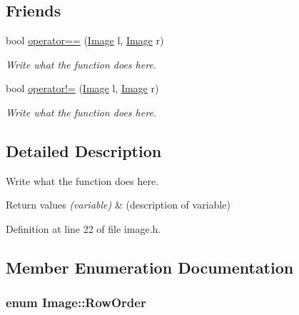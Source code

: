 \subsection*{Friends}
\begin{DoxyCompactItemize}
\item 
bool \hyperlink{classImage_a2304aa1c9fbc445512db17eadc2c3f6f}{operator==} (\hyperlink{classImage}{Image} l, \hyperlink{classImage}{Image} r)
\begin{DoxyCompactList}\small\item\em Write what the function does here. \end{DoxyCompactList}\item 
bool \hyperlink{classImage_ac96614d2b0093664f753bb88a95c0815}{operator!=} (\hyperlink{classImage}{Image} l, \hyperlink{classImage}{Image} r)
\begin{DoxyCompactList}\small\item\em Write what the function does here. \end{DoxyCompactList}\end{DoxyCompactItemize}


\subsection{Detailed Description}
Write what the function does here. 


\begin{DoxyRetVals}{Return values}
{\em (variable)} & (description of variable) \\
\hline
\end{DoxyRetVals}


Definition at line 22 of file image.\+h.



\subsection{Member Enumeration Documentation}
\hypertarget{classImage_a856d0983e089ff127d0bcad3828c1aab}{
\subsubsection[{Row\+Order}]{\setlength{\rightskip}{0pt plus 5cm}enum {\bf Image\+::\+Row\+Order}\hspace{0.3cm}{\ttfamily [private]}}}\label{classImage_a856d0983e089ff127d0bcad3828c1aab}


